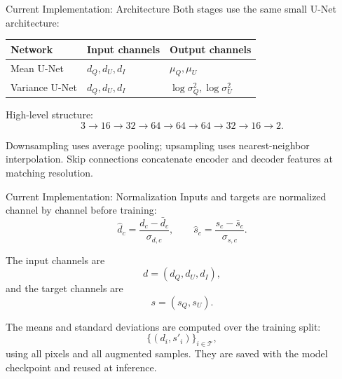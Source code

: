 \documentclass[10pt,aspectratio=169]{beamer}
\newcommand{\signal}{s}
\newcommand{\data}{d}
\newcommand{\synth}{s'}
\begin{document}
\begin{frame}{Current Implementation: Architecture}
  Both stages use the same small U-Net architecture:

  \vspace{0.4em}
  \begin{center}
  \begin{tabular}{lll}
    \toprule
    Network & Input channels & Output channels \\
    \midrule
    Mean U-Net & \(d_Q,d_U,d_I\) & \(\mu_Q,\mu_U\) \\
    Variance U-Net & \(d_Q,d_U,d_I\) & \(\log\sigma_Q^2,\log\sigma_U^2\) \\
    \bottomrule
  \end{tabular}
  \end{center}

  \vspace{0.5em}
  High-level structure:
  \[
    3 \rightarrow 16 \rightarrow 32 \rightarrow 64 \rightarrow 64
    \rightarrow 64 \rightarrow 32 \rightarrow 16 \rightarrow 2 .
  \]

  \vspace{0.4em}
  Downsampling uses average pooling; upsampling uses nearest-neighbor interpolation.
  Skip connections concatenate encoder and decoder features at matching resolution.
\end{frame}

\begin{frame}{Current Implementation: Normalization}
  Inputs and targets are normalized channel by channel before training:
  \[
    \widehat{\data}_{c}
    =
    \frac{\data_c-\bar{\data}_c}{\sigma_{\data,c}},
    \qquad
    \widehat{\signal}_{c}
    =
    \frac{\signal_c-\bar{\signal}_c}{\sigma_{\signal,c}} .
  \]

  \vspace{0.5em}
  The input channels are
  \[
    \data=(d_Q,d_U,d_I),
  \]
  and the target channels are
  \[
    \signal=(s_Q,s_U).
  \]

  \vspace{0.5em}
  The means and standard deviations are computed over the training split:
  \[
    \{(\data_i,\synth_i)\}_{i\in \mathcal{T}},
  \]
  using all pixels and all augmented samples. They are saved with the model checkpoint and reused at inference.
\end{frame}
\end{document}
